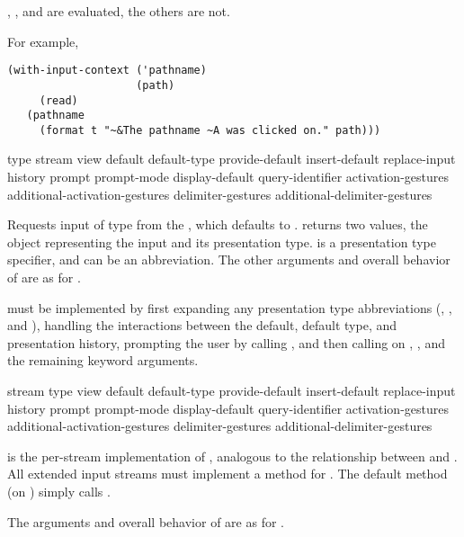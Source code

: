, , and  are evaluated, the others are not.

For example,
\begin{verbatim}
(with-input-context ('pathname)
                    (path)
     (read)
   (pathname
     (format t "~&The pathname ~A was clicked on." path)))
\end{verbatim}


 {type
                 \key stream view
                      default default-type provide-default 
                      insert-default replace-input history
                      prompt prompt-mode display-default query-identifier
                      activation-gestures additional-activation-gestures
                      delimiter-gestures additional-delimiter-gestures}

Requests input of type  from the  , which
defaults to .   returns two values, the object
representing the input and its presentation type.   is a presentation
type specifier, and can be an abbreviation.  The other arguments and overall
behavior of  are as for .

 must be implemented by first expanding any presentation type
abbreviations (, , and ), handling the
interactions between the default, default type, and presentation history,
prompting the user by calling , and then calling
 on , , and the remaining keyword
arguments.

 {stream type
                             \key view 
                                  default default-type provide-default 
                                  insert-default replace-input history
                                  prompt prompt-mode display-default query-identifier
                                  activation-gestures additional-activation-gestures
                                  delimiter-gestures additional-delimiter-gestures}

 is the per-stream implementation of , analogous to
the relationship between  and .  All extended
input streams must implement a method for .  The default
method (on ) simply calls .

The arguments and overall behavior of  are as for .


